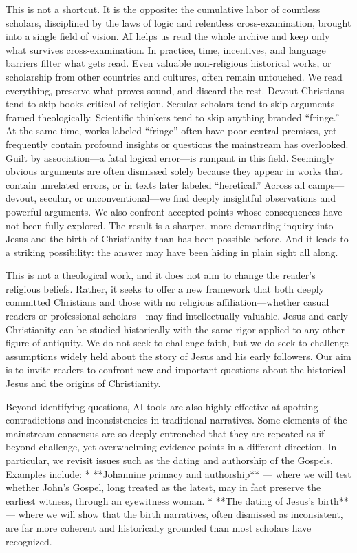 This is not a shortcut.
It is the opposite: the cumulative labor of countless scholars, disciplined by the laws of logic and relentless cross-examination, brought into a single field of vision.
AI helps us read the whole archive and keep only what survives cross-examination.
In practice, time, incentives, and language barriers filter what gets read.
Even valuable non-religious historical works, or scholarship from other countries and cultures, often remain untouched.
We read everything, preserve what proves sound, and discard the rest.
Devout Christians tend to skip books critical of religion.
Secular scholars tend to skip arguments framed theologically.
Scientific thinkers tend to skip anything branded “fringe.”
At the same time, works labeled “fringe” often have poor central premises, yet frequently contain profound insights or questions the mainstream has overlooked.
Guilt by association—a fatal logical error—is rampant in this field.
Seemingly obvious arguments are often dismissed solely because they appear in works that contain unrelated errors, or in texts later labeled “heretical.”
Across all camps—devout, secular, or unconventional—we find deeply insightful observations and powerful arguments.
We also confront accepted points whose consequences have not been fully explored.
The result is a sharper, more demanding inquiry into Jesus and the birth of Christianity than has been possible before.
And it leads to a striking possibility: the answer may have been hiding in plain sight all along.

This is not a theological work, and it does not aim to change the reader’s religious beliefs.
Rather, it seeks to offer a new framework that both deeply committed Christians and those with no religious affiliation—whether casual readers or professional scholars—may find intellectually valuable.
Jesus and early Christianity can be studied historically with the same rigor applied to any other figure of antiquity.
We do not seek to challenge faith, but we do seek to challenge assumptions widely held about the story of Jesus and his early followers.
Our aim is to invite readers to confront new and important questions about the historical Jesus and the origins of Christianity.

Beyond identifying questions, AI tools are also highly effective at spotting contradictions and inconsistencies in traditional narratives.
Some elements of the mainstream consensus are so deeply entrenched that they are repeated as if beyond challenge, yet overwhelming evidence points in a different direction.
In particular, we revisit issues such as the dating and authorship of the Gospels.
Examples include:
* **Johannine primacy and authorship** — where we will test whether John’s Gospel, long treated as the latest, may in fact preserve the earliest witness, through an eyewitness woman.
* **The dating of Jesus’s birth** — where we will show that the birth narratives, often dismissed as inconsistent, are far more coherent and historically grounded than most scholars have recognized.

